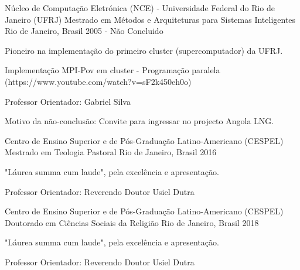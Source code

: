 \begin{cventries}

\cventry
{Núcleo de Computação Eletrónica (NCE) - Universidade Federal do Rio de Janeiro (UFRJ)} %
{Mestrado em Métodos e Arquiteturas para Sistemas Inteligentes} %
{Rio de Janeiro, Brasil} %
{2005 - Não Concluido} %
{ %
\begin{cvitems}
\item {Pioneiro na implementação do primeiro cluster (supercomputador) da UFRJ.}
\item {Implementação MPI-Pov em cluster - Programação paralela (https://www.youtube.com/watch?v=sF2k450eh0o)}
\item {Professor Orientador: Gabriel Silva}
\item {Motivo da não-conclusão: Convite para ingressar no projecto Angola LNG.}
\end{cvitems}
}


\cventry
{Centro de Ensino Superior e de Pós-Graduação Latino-Americano (CESPEL)} %
{Mestrado em Teologia Pastoral} %
{Rio de Janeiro, Brasil} %
{2016} %
{ %
\begin{cvitems}
\item {"Láurea summa cum laude", pela excelência e apresentação.}
\item {Professor Orientador: Reverendo Doutor Usiel Dutra}
\end{cvitems}
}


\cventry
{Centro de Ensino Superior e de Pós-Graduação Latino-Americano (CESPEL)} %
{Doutorado em Ciências Sociais da Religião} %
{Rio de Janeiro, Brasil} %
{2018} %
{ %
\begin{cvitems}
\item {"Láurea summa cum laude", pela excelência e apresentação.}
\item {Professor Orientador: Reverendo Doutor Usiel Dutra}
\end{cvitems}
}


\end{cventries}
